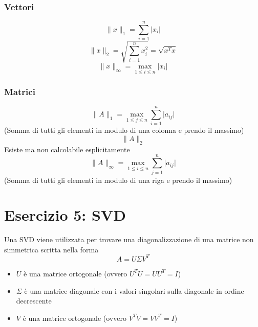 \documentclass[10pt]{article}
\begin{document}
\subsubsection{Vettori}
\begin{equation*}
    \lVert x \rVert_{1} = \sum_{i=1}^{n}\lvert x_{i} \rvert
\end{equation*}
\begin{equation*}
    \lVert x \rVert_{2} = \sqrt{\sum_{i=1}^{n}x_{i}^{2}} = \sqrt{x^{T}x}
\end{equation*}
\begin{equation*}
    \lVert x \rVert_{\infty} = \max_{1\leq i\leq n}\lvert x_{i} \rvert
\end{equation*}
\subsubsection{Matrici}
\begin{equation*}
    \lVert A \rVert_{1} = \max_{1\leq j\leq n}\sum_{i=1}^{n}\lvert a_{ij} \rvert
\end{equation*} (Somma di tutti gli elementi in modulo di una colonna e prendo il massimo)
\begin{equation*}
    \lVert A \rVert_{2}
\end{equation*} Esiste ma non calcolabile esplicitamente
\begin{equation*}
    \lVert A \rVert_{\infty} = \max_{1\leq i\leq n}\sum_{j=1}^{n}\lvert a_{ij} \rvert
\end{equation*} (Somma di tutti gli elementi in modulo di una riga e prendo il massimo)
\section{Esercizio 5: SVD}
Una SVD viene utilizzata per trovare una diagonalizzazione di una matrice non simmetrica scritta nella forma \begin{equation*}
    A = U\Sigma V^{T}
\end{equation*}
\begin{itemize}
    \item $U$ è una matrice ortogonale (ovvero $U^{T}U=UU^{T}=I$)
    \item $\Sigma$ è una matrice diagonale con i valori singolari sulla diagonale in ordine decrescente
    \item $V$ è una matrice ortogonale (ovvero $V^{T}V=VV^{T}=I$)
\end{itemize}
\end{document}
